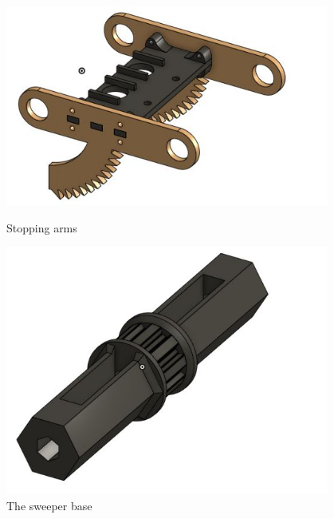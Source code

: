 \begin{figure}[ht]
\centering
\begin{minipage}[b]{.48\textwidth}
  \centering
  \includegraphics[width=0.95\textwidth]{Meetings/January/01-17-22/1-17-22_CAD_Figure3 - Nathan Forrer.JPG}
  \caption{Stopping arms}
  \label{fig:011722_6}
\end{minipage}%
\hfill%
\begin{minipage}[b]{.48\textwidth}
  \centering
  \includegraphics[width=0.95\textwidth]{Meetings/January/01-17-22/1-17-22_CAD_Figure4 - Nathan Forrer.JPG}
  \caption{The sweeper base}
  \label{fig:011722_7}
\end{minipage}
\end{figure}

